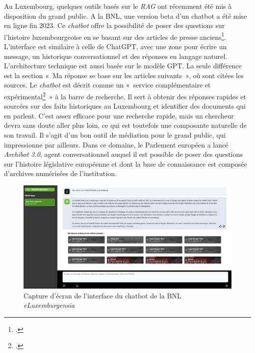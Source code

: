 	Au Luxembourg, quelques outils basés sur le \emph{RAG} ont récemment été mis à
	disposition du grand public. A la BNL, une version beta d'un
	\gls{chatbot} a été mise en ligne fin 2023. Ce \emph{chatbot} offre la
	possibilité de poser des questions sur l'histoire luxembourgeoise en se
	basant sur des articles de presse anciens\footcite{noauthor_eluxemburgensialu_2023}.
	L'interface est similaire à celle de ChatGPT, avec une zone pour écrire
	un message, un historique conversationnel et des réponses en langage
	naturel. L'architecture technique est aussi basée sur le modèle GPT.
	La seule différence est la section «~Ma réponse se base sur les articles
	suivants~», où sont citées les sources. Le \textit{chatbot} est décrit comme un «~service
	complémentaire et expérimental\footcite{noauthor_eluxemburgensia_nodate}~»
	à la barre de recherche. Il sert à obtenir des réponses rapides et
	sourcées sur des faits historiques au Luxembourg et identifier des documents qui
	en parlent. C'est assez efficace pour une recherche rapide, mais un
	chercheur devra sans doute aller plus loin, ce qui est toutefois une composante naturelle de son travail. Il s'agit
	d'un bon outil de médiation pour le grand public, qui impressionne par
	ailleurs. Dans ce domaine, le Parlement européen a lancé \emph{Archibot 3.0},
	agent conversationnel auquel il est possible de poser des questions sur
	l'histoire législative européenne et dont la base de
	connaissance est composée d'archives numérisées de l'institution. 

	
	\begin{figure}
		\centerline{\includegraphics[width=\textwidth]{./media/image5.png}}
		\caption{Capture d'écran de l'interface du chatbot de la BNL \emph{eLuxemburgensia} }
	\end{figure}

